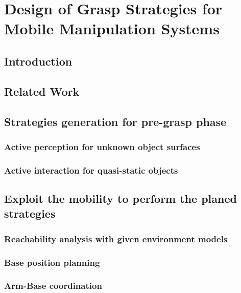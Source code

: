\chapter{Design of Grasp Strategies for Mobile Manipulation Systems}
\section{Introduction}

\section{Related Work}

\section{Strategies generation for pre-grasp phase}

\subsection{Active perception for unknown object surfaces}

\subsection{Active interaction for quasi-static objects }	


\section{Exploit the mobility to perform the planed strategies}

\subsection{Reachability analysis with given environment models}

\subsection{Base position planning}


\subsection{Arm-Base coordination}


